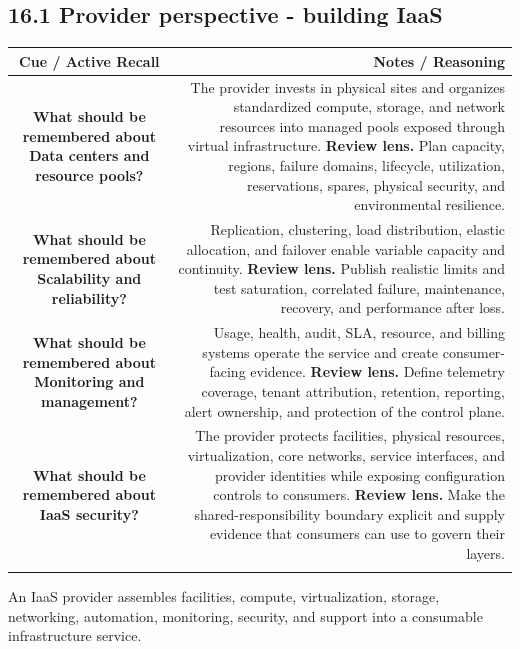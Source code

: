 \documentclass[11pt]{article}
\newcommand{\CornellHeader}{\rowcolor{Navy}\color{white}\bfseries Cue / Active Recall & \color{white}\bfseries Notes / Reasoning \\\endhead}
\newcommand{\CornellRow}[2]{\cellcolor{CueGray}\textbf{#1} & #2 \\\addlinespace[3pt]}
\begin{document}
\subsection{16.1 Provider perspective - building IaaS}
\begin{longtable}{@{}C N@{}}
\CornellHeader
\CornellRow{What should be remembered about Data centers and resource pools?}{The provider invests in physical sites and organizes standardized compute, storage, and network resources into managed pools exposed through virtual infrastructure. \textbf{Review lens.} Plan capacity, regions, failure domains, lifecycle, utilization, reservations, spares, physical security, and environmental resilience.}
\CornellRow{What should be remembered about Scalability and reliability?}{Replication, clustering, load distribution, elastic allocation, and failover enable variable capacity and continuity. \textbf{Review lens.} Publish realistic limits and test saturation, correlated failure, maintenance, recovery, and performance after loss.}
\CornellRow{What should be remembered about Monitoring and management?}{Usage, health, audit, SLA, resource, and billing systems operate the service and create consumer-facing evidence. \textbf{Review lens.} Define telemetry coverage, tenant attribution, retention, reporting, alert ownership, and protection of the control plane.}
\CornellRow{What should be remembered about IaaS security?}{The provider protects facilities, physical resources, virtualization, core networks, service interfaces, and provider identities while exposing configuration controls to consumers. \textbf{Review lens.} Make the shared-responsibility boundary explicit and supply evidence that consumers can use to govern their layers.}
\end{longtable}
\begin{sectionsummarybox}
An IaaS provider assembles facilities, compute, virtualization, storage, networking, automation, monitoring, security, and support into a consumable infrastructure service.
\end{sectionsummarybox}
\end{document}
